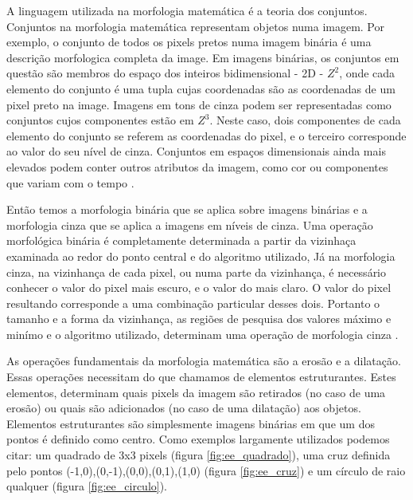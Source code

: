 A linguagem utilizada na morfologia matemática é a teoria dos conjuntos. Conjuntos na morfologia matemática representam objetos numa imagem. Por exemplo, o conjunto de todos os pixels pretos numa imagem binária é uma descrição morfologica completa da image. Em imagens binárias, os conjuntos em questão são membros do espaço dos inteiros bidimensional - 2D - $Z^2$, onde cada elemento do conjunto é uma tupla cujas coordenadas são as coordenadas de um pixel preto na image. Imagens em tons de cinza podem ser representadas como conjuntos cujos componentes estão em $Z^3$. Neste caso, dois componentes de cada elemento do conjunto se referem as coordenadas do pixel, e o terceiro corresponde ao valor do seu nível de cinza. Conjuntos em espaços dimensionais ainda mais elevados podem conter outros atributos da imagem, como cor ou componentes que variam com o tempo \cite{gonzalez}.

Então temos a morfologia binária que se aplica sobre imagens binárias e a morfologia cinza que se aplica a imagens em níveis de cinza. Uma operação morfológica binária é completamente determinada a partir da vizinhaça examinada ao redor do ponto central e do algoritmo utilizado, Já na morfologia cinza, na vizinhança de cada pixel, ou numa parte da vizinhança, é necessário conhecer o valor do pixel mais escuro, e o valor do mais claro. O valor do pixel resultando corresponde a uma combinação particular desses dois. Portanto o tamanho e a forma da vizinhança, as regiões de pesquisa dos valores máximo e minímo e o algoritmo utilizado, determinam uma operação de morfologia cinza \cite{facon}.

As operações fundamentais da morfologia matemática são a erosão e a dilatação. Essas operações necessitam do que chamamos de elementos estruturantes. Estes elementos, determinam quais pixels da imagem são retirados (no caso de uma erosão) ou quais são adicionados (no caso de uma dilatação) aos objetos. Elementos estruturantes são simplesmente imagens binárias em que um dos pontos é definido como centro. Como exemplos largamente utilizados podemos citar: um quadrado de 3x3 pixels (figura \ref{fig:ee_quadrado}), uma cruz definida pelo pontos {(-1,0),(0,-1),(0,0),(0,1),(1,0)} (figura \ref{fig:ee_cruz}) e um círculo de raio qualquer (figura \ref{fig:ee_circulo}).

